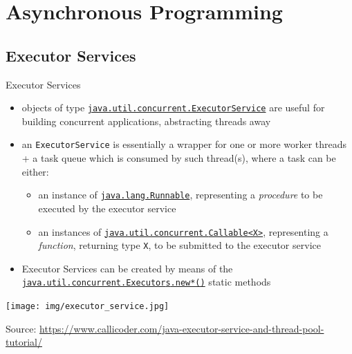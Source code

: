 \documentclass[presentation]{beamer}\mode<presentation>{\usetheme{AMSBolognaFC}}
\begin{document}
\section{Asynchronous Programming}

\subsection{Executor Services}

\begin{frame}[c,allowframebreaks]{Executor Services}

	\begin{itemize}
		\item objects of type \href{https://docs.oracle.com/javase/8/docs/api/java/util/concurrent/ExecutorService.html}{\texttt{java.util.concurrent.\alert{ExecutorService}}} are useful for building \alert{concurrent} applications, abstracting threads away

		\bigskip

		\item an \alert{\texttt{ExecutorService}} is essentially a wrapper for one or more \alert{worker} threads + a \alert{task queue} which is consumed by such thread(s), where a task can be either:
		\begin{itemize}
			\item an instance of \href{https://docs.oracle.com/javase/8/docs/api/java/lang/Runnable.html}{\texttt{java.lang.\alert{Runnable}}}, representing a \emph{procedure} to be \alert{executed} by the executor service

			\item an instances of \href{https://docs.oracle.com/javase/8/docs/api/java/util/concurrent/Callable.html}{\texttt{java.util.concurrent.\alert{Callable<X>}}}, representing a \emph{function}, returning type \texttt{X}, to be \alert{submitted} to the executor service
		\end{itemize}

		\bigskip

		\item Executor Services can be created by means of the \href{https://docs.oracle.com/javase/8/docs/api/java/util/concurrent/Executors.html}{\texttt{java.util.concurrent.Executor\alert{s}.new*()}} static methods
	\end{itemize}

	\framebreak

	\begin{center}
		\texttt{[image: img/executor\_service.jpg]}

		{\tiny Source: \url{https://www.callicoder.com/java-executor-service-and-thread-pool-tutorial/}}
	\end{center}

	\framebreak

	

\end{frame}
\end{document}
